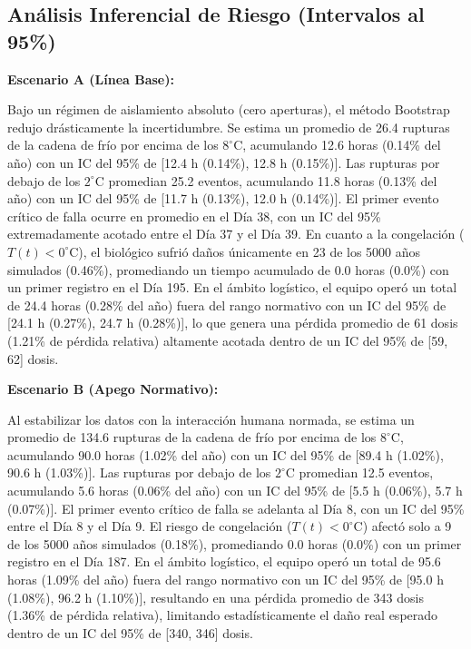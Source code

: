 \documentclass[
  spanish,
  letterpaper,
  DIV=11,
  numbers=noendperiod]{scrreprt}
\theoremstyle{plain}
\theoremstyle{plain}
\theoremstyle{plain}
\theoremstyle{definition}
\theoremstyle{remark}
\begin{document}
\subsection{Análisis Inferencial de Riesgo (Intervalos al
95\%)}\label{anuxe1lisis-inferencial-de-riesgo-intervalos-al-95}

\textbf{Escenario A (Línea Base):}

Bajo un régimen de aislamiento absoluto (cero aperturas), el método
Bootstrap redujo drásticamente la incertidumbre. Se estima un promedio
de 26.4 rupturas de la cadena de frío por encima de los
\(8^\circ\text{C}\), acumulando 12.6 horas (0.14\% del año) con un IC
del 95\% de {[}12.4 h (0.14\%), 12.8 h (0.15\%){]}. Las rupturas por
debajo de los \(2^\circ\text{C}\) promedian 25.2 eventos, acumulando
11.8 horas (0.13\% del año) con un IC del 95\% de {[}11.7 h (0.13\%),
12.0 h (0.14\%){]}. El primer evento crítico de falla ocurre en promedio
en el Día 38, con un IC del 95\% extremadamente acotado entre el Día 37
y el Día 39. En cuanto a la congelación (\(T(t)<0^\circ\text{C}\)), el
biológico sufrió daños únicamente en 23 de los 5000 años simulados
(0.46\%), promediando un tiempo acumulado de 0.0 horas (0.0\%) con un
primer registro en el Día 195. En el ámbito logístico, el equipo operó
un total de 24.4 horas (0.28\% del año) fuera del rango normativo con un
IC del 95\% de {[}24.1 h (0.27\%), 24.7 h (0.28\%){]}, lo que genera una
pérdida promedio de 61 dosis (1.21\% de pérdida relativa) altamente
acotada dentro de un IC del 95\% de {[}59, 62{]} dosis.

\textbf{Escenario B (Apego Normativo):}

Al estabilizar los datos con la interacción humana normada, se estima un
promedio de 134.6 rupturas de la cadena de frío por encima de los
\(8^\circ\text{C}\), acumulando 90.0 horas (1.02\% del año) con un IC
del 95\% de {[}89.4 h (1.02\%), 90.6 h (1.03\%){]}. Las rupturas por
debajo de los \(2^\circ\text{C}\) promedian 12.5 eventos, acumulando 5.6
horas (0.06\% del año) con un IC del 95\% de {[}5.5 h (0.06\%), 5.7 h
(0.07\%){]}. El primer evento crítico de falla se adelanta al Día 8, con
un IC del 95\% entre el Día 8 y el Día 9. El riesgo de congelación
(\(T(t)<0^\circ\text{C}\)) afectó solo a 9 de los 5000 años simulados
(0.18\%), promediando 0.0 horas (0.0\%) con un primer registro en el Día
187. En el ámbito logístico, el equipo operó un total de 95.6 horas
(1.09\% del año) fuera del rango normativo con un IC del 95\% de {[}95.0
h (1.08\%), 96.2 h (1.10\%){]}, resultando en una pérdida promedio de
343 dosis (1.36\% de pérdida relativa), limitando estadísticamente el
daño real esperado dentro de un IC del 95\% de {[}340, 346{]} dosis.
\end{document}
